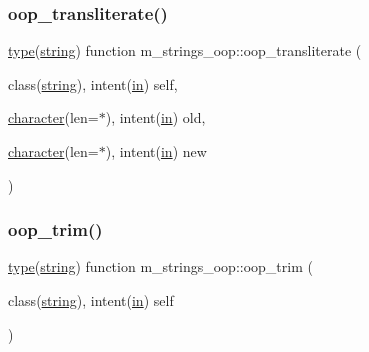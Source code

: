 \mbox{\label{namespacem__strings__oop_ac88f27671dd1129023494bf2500ca7fd}} 
\subsubsection{\texorpdfstring{oop\+\_\+transliterate()}{oop\_transliterate()}}
{\footnotesize\ttfamily \hyperlink{stop__watch_83_8txt_a70f0ead91c32e25323c03265aa302c1c}{type}(\hyperlink{structm__strings__oop_1_1string}{string}) function m\+\_\+strings\+\_\+oop\+::oop\+\_\+transliterate (\begin{DoxyParamCaption}\item[{class(\hyperlink{structm__strings__oop_1_1string}{string}), intent(\hyperlink{M__journal_83_8txt_afce72651d1eed785a2132bee863b2f38}{in})}]{self,  }\item[{\hyperlink{option__stopwatch_83_8txt_abd4b21fbbd175834027b5224bfe97e66}{character}(len=$\ast$), intent(\hyperlink{M__journal_83_8txt_afce72651d1eed785a2132bee863b2f38}{in})}]{old,  }\item[{\hyperlink{option__stopwatch_83_8txt_abd4b21fbbd175834027b5224bfe97e66}{character}(len=$\ast$), intent(\hyperlink{M__journal_83_8txt_afce72651d1eed785a2132bee863b2f38}{in})}]{new }\end{DoxyParamCaption})\hspace{0.3cm}{\ttfamily [private]}}

\mbox{\label{namespacem__strings__oop_ab9238801d6c3af2fe7ee81c8d2c514ff}} 
\subsubsection{\texorpdfstring{oop\+\_\+trim()}{oop\_trim()}}
{\footnotesize\ttfamily \hyperlink{stop__watch_83_8txt_a70f0ead91c32e25323c03265aa302c1c}{type}(\hyperlink{structm__strings__oop_1_1string}{string}) function m\+\_\+strings\+\_\+oop\+::oop\+\_\+trim (\begin{DoxyParamCaption}\item[{class(\hyperlink{structm__strings__oop_1_1string}{string}), intent(\hyperlink{M__journal_83_8txt_afce72651d1eed785a2132bee863b2f38}{in})}]{self }\end{DoxyParamCaption})\hspace{0.3cm}{\ttfamily [private]}}

